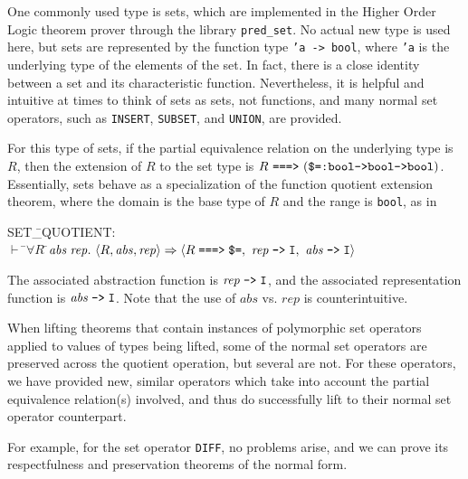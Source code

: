 \documentclass[envcountsame,runningheads]{llncs}
\begin{document}
One commonly used type is sets, which are implemented in the Higher
Order Logic theorem prover through the library {\tt pred\_set}.  No actual
new type is used here, but sets are represented by the function type
{\tt 'a -> bool}, where {\tt 'a} is the underlying type of the elements
of the set.
In fact, there is a close identity between a set and its characteristic
function.  Nevertheless, it is helpful and intuitive at times to think
of sets as sets, not functions, and many normal set operators, such
as {\tt INSERT}, {\tt SUBSET}, and {\tt UNION}, are provided.

For this type of sets,
if the partial equivalence relation
on the underlying type is $R$, then
the extension of $R$
to the set type is
$R \ \mbox{\tt ===>} \ (\mbox{\tt \$=:bool->bool->bool})$.
Essentially, sets behave as a specialization of the
function quotient extension theorem, where the domain is the base type of $R$
and the range is {\tt bool}, as in
{\tt \begin{tabbing}
SET\=\_QUOTIENT: \\
\>  $\vdash$  \=$\forall R\;$\=${\it abs}\;{\it rep}.\
          \langle R,{\it abs},{\it rep} \rangle \Rightarrow
          \langle R\;\mbox{\tt ===>}\;\mbox{\tt \$=},\
            {\it rep}\;\mbox{\tt -->}\;{\tt I},\
            {\it abs}\;\mbox{\tt -->}\;{\tt I}
          \rangle$
\end{tabbing}}
The associated abstraction function
is ${\it rep}\;\mbox{\tt -->}\;{\tt I}$,
and the associated representation function
is ${\it abs}\;\mbox{\tt -->}\;{\tt I}$.
Note that the use of $abs$ vs. $rep$ is counterintuitive.

When lifting theorems that contain instances of polymorphic set operators
applied to values of types being lifted, some of the normal set
operators are preserved across the quotient operation, but several are
not.  For these operators, we have provided new, similar operators
which take into account the partial equivalence relation(s) involved,
and thus do successfully lift to their normal set operator counterpart.

For example, for the set operator {\tt DIFF}, no problems arise, and
we can prove its respectfulness and preservation theorems of the normal
form.
\end{document}
